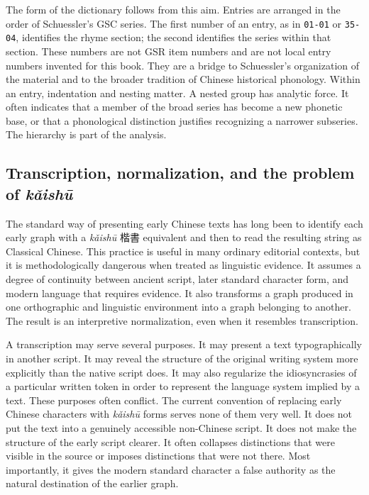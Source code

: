 The form of the dictionary follows from this aim. Entries are arranged in the order of Schuessler's GSC series. The first number of an entry, as in \texttt{01-01} or \texttt{35-04}, identifies the rhyme section; the second identifies the series within that section. These numbers are not GSR item numbers and are not local entry numbers invented for this book. They are a bridge to Schuessler's organization of the material and to the broader tradition of Chinese historical phonology. Within an entry, indentation and nesting matter. A nested group has analytic force. It often indicates that a member of the broad series has become a new phonetic base, or that a phonological distinction justifies recognizing a narrower subseries. The hierarchy is part of the analysis.

\subsection*{Transcription, normalization, and the problem of \emph{kǎishū}}

The standard way of presenting early Chinese texts has long been to identify each early graph with a \emph{kǎishū} 楷書 equivalent and then to read the resulting string as Classical Chinese. This practice is useful in many ordinary editorial contexts, but it is methodologically dangerous when treated as linguistic evidence. It assumes a degree of continuity between ancient script, later standard character form, and modern language that requires evidence. It also transforms a graph produced in one orthographic and linguistic environment into a graph belonging to another. The result is an interpretive normalization, even when it resembles transcription.

A transcription may serve several purposes. It may present a text typographically in another script. It may reveal the structure of the original writing system more explicitly than the native script does. It may also regularize the idiosyncrasies of a particular written token in order to represent the language system implied by a text. These purposes often conflict. The current convention of replacing early Chinese characters with \emph{kǎishū} forms serves none of them very well. It does not put the text into a genuinely accessible non-Chinese script. It does not make the structure of the early script clearer. It often collapses distinctions that were visible in the source or imposes distinctions that were not there. Most importantly, it gives the modern standard character a false authority as the natural destination of the earlier graph.

